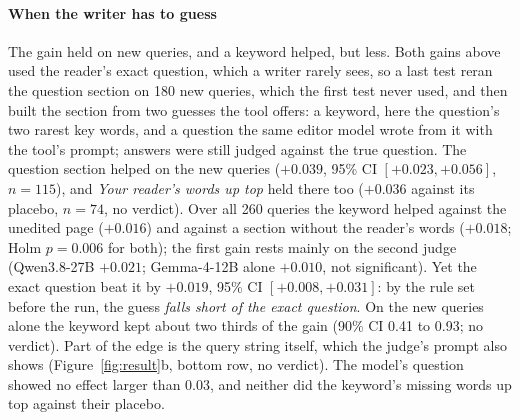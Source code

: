 \paragraph{When the writer has to guess}
The gain held on new queries, and a keyword helped, but less.
Both gains above used the reader's exact question, which a writer rarely sees, so a last test reran the question section on 180 new queries, which the first test never used, and then built the section from two guesses the tool offers: a keyword, here the question's two rarest key words, and a question the same editor model wrote from it with the tool's prompt; answers were still judged against the true question.
The question section helped on the new queries ($+0.039$, 95\% CI $[+0.023, +0.056]$, $n = 115$), and \emph{Your reader's words up top} held there too ($+0.036$ against its placebo, $n = 74$, no verdict).
Over all 260 queries the keyword helped against the unedited page ($+0.016$) and against a section without the reader's words ($+0.018$; Holm $p = 0.006$ for both); the first gain rests mainly on the second judge (Qwen3.8-27B $+0.021$; Gemma-4-12B alone $+0.010$, not significant).
Yet the exact question beat it by $+0.019$, 95\% CI $[+0.008, +0.031]$: by the rule set before the run, the guess \emph{falls short of the exact question}.
On the new queries alone the keyword kept about two thirds of the gain (90\% CI 0.41 to 0.93; no verdict).
Part of the edge is the query string itself, which the judge's prompt also shows (Figure~\ref{fig:result}b, bottom row, no verdict).
The model's question showed no effect larger than 0.03, and neither did the keyword's missing words up top against their placebo.

